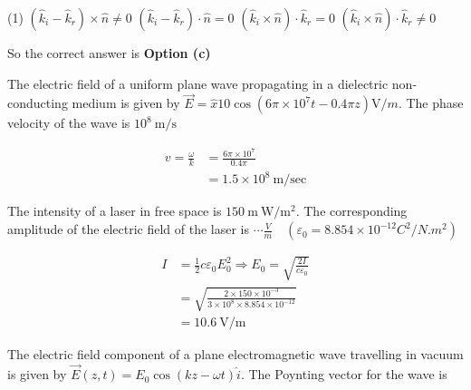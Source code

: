 \begin{enumerate}
\begin{minipage}{\textwidth}
	\end{minipage}
	\begin{tasks}(1)
		\task[\textbf{a.}] $\left(\hat{k}_{i}-\hat{k}_{r}\right) \times \hat{n} \neq 0$
		\task[\textbf{b.}]$\left(\hat{k}_{i}-\hat{k}_{r}\right) \cdot \hat{n}=0$
		\task[\textbf{c.}]$\left(\hat{k}_{i} \times \hat{n}\right) \cdot \hat{k}_{r}=0$
		\task[\textbf{d.}]$\left(\hat{k}_{i} \times \hat{n}\right) \cdot \hat{k}_{r} \neq 0$
	\end{tasks}
\begin{answer}
	So the correct answer is \textbf{Option (c)}
\end{answer}
	\begin{minipage}{\textwidth}
		\item The electric field of a uniform plane wave propagating in a dielectric non-conducting medium is given by $\vec{E}=\hat{x} 10 \cos \left(6 \pi \times 10^{7} t-0.4 \pi z\right) \mathrm{V} / m$. The phase velocity of the wave is $10^{8} \mathrm{~m} / \mathrm{s}$ 
	\end{minipage}
\begin{answer}
	\begin{align*}
	v=\frac{\omega}{k}&=\frac{6 \pi \times 10^{7}}{0.4 \pi}\\&=1.5 \times 10^{8} \mathrm{~m} / \mathrm{sec}
	\end{align*}
\end{answer}
	\begin{minipage}{\textwidth}
		\item The intensity of a laser in free space is $150 \mathrm{~m} \mathrm{~W} / \mathrm{m}^{2}$. The corresponding amplitude of the electric field of the laser is $\cdots\frac{V}{m} \quad\left(\varepsilon_{0}=8.854 \times 10^{-12} C^{2} / N . m^{2}\right)$
	\end{minipage}
	\begin{answer}
		\begin{align*}
		I&=\frac{1}{2} c \varepsilon_{0} E_{0}^{2} \Rightarrow E_{0}=\sqrt{\frac{2 I}{c \varepsilon_{0}}}\\&=\sqrt{\frac{2 \times 150 \times 10^{-3}}{3 \times 10^{8} \times 8.854 \times 10^{-12}}}\\&=10.6 \mathrm{~V} / \mathrm{m}
		\end{align*}
	\end{answer}
	\begin{minipage}{\textwidth}
		\item The electric field component of a plane electromagnetic wave travelling in vacuum is given by $\vec{E}(z, t)=E_{0} \cos (k z-\omega t) \hat{i}$. The Poynting vector for the wave is

\end{minipage}
\end{enumerate}
